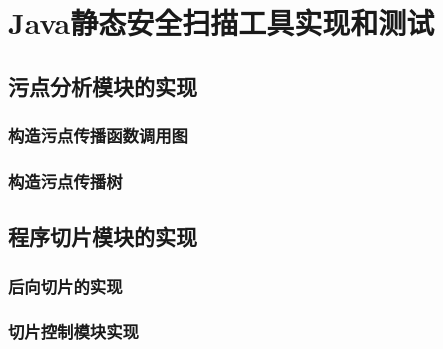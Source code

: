\chapter{Java静态安全扫描工具实现和测试}
\section{污点分析模块的实现}
\subsection{构造污点传播函数调用图}


\subsection{构造污点传播树}

\section{程序切片模块的实现}

\subsection{后向切片的实现}






\subsection{切片控制模块实现}



